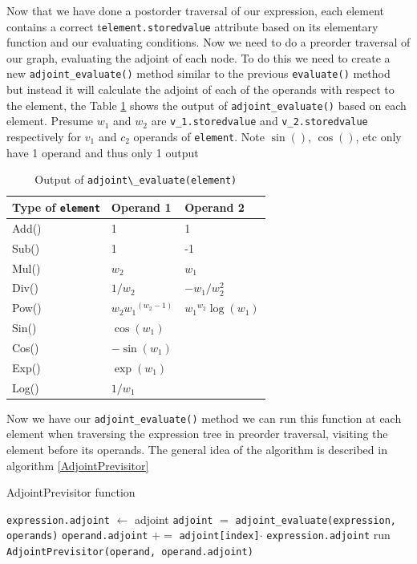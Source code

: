 \documentclass{article}
\begin{document}
Now that we have done a postorder traversal of our expression, each element contains a correct t\verb|element.storedvalue| attribute based on its elementary function and our evaluating conditions. Now we need to do a preorder traversal of our graph, evaluating the adjoint of each node. To do this we need to create a new \verb|adjoint_evaluate()| method similar to the previous \verb|evaluate()| method but instead it will calculate the adjoint of each of the operands with respect to the element, the Table \ref{tab:AdjEval} shows the output of \verb|adjoint_evaluate()| based on each element. Presume $w_1$ and $w_2$ are \verb|v_1.storedvalue| and \verb|v_2.storedvalue| respectively for $v_1$ and $c_2$ operands of \verb|element|. Note $\sin()$, $\cos()$, etc only have 1 operand and thus only 1 output

\begin{table}[h!]
    \centering
    \begin{tabular}{|lll|}
        \hline
        Type of \verb|element| & Operand 1  & Operand 2 \\
        \hline
        Add() & 1 & 1 \\
        Sub() & 1 & -1 \\
        Mul() & $w_2$ & $w_1$ \\
        Div() & $1/w_2$ & $-w_1/w_2^2$ \\
        Pow() & $w_2{w_1}^{(w_2-1)}$ & ${w_1}^{w_2}\log(w_1)$ \\
        Sin() & $\cos(w_1)$ &  \\
        Cos() & $-\sin(w_1)$ &  \\
        Exp() & $\exp(w_1)$ &  \\
        Log() & $1/w_1$ &  \\
        \hline
    \end{tabular}
    \caption{Output of \verb|adjoint\_evaluate(element)|}
    \label{tab:AdjEval}
\end{table}

Now we have our \verb|adjoint_evaluate()| method we can run this function at each element when traversing the expression tree in preorder traversal, visiting the element before its operands. The general idea of the algorithm is described in algorithm \ref{AdjointPrevisitor}

\begin{algorithm}[h]
\caption{AdjointPrevisitor function}\label{AdjointPrevisitor}
\begin{algorithmic}[1]
\State \verb|expression.adjoint| $\gets$ adjoint
\State \verb|adjoint| $=$ \verb|adjoint_evaluate(expression, operands)|
\State \verb|operand.adjoint| $+=$ \verb|adjoint[index]|$\cdot$ \verb|expression.adjoint|
\State run \verb|AdjointPrevisitor(operand, operand.adjoint)|
\EndFor
\EndProcedure
\end{algorithmic}
\end{algorithm}
\end{document}
